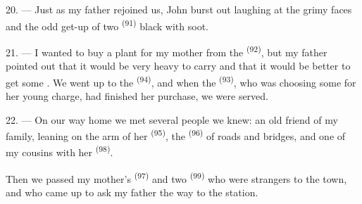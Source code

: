 20. --- Just as my father rejoined us, John burst out laughing at the
grimy faces and the odd get-up of two  \textsuperscript{(91)}
black with soot.

21. --- I wanted to buy a plant for my mother from the 
\textsuperscript{(92)}, but my father pointed out that it would be very heavy to
carry and that it would be better to get some . We went up to
the  \textsuperscript{(94)}, and when the 
\textsuperscript{(93)}, who was choosing some for her young charge, had finished her
purchase, we were served.

22. --- On our way home we met several people we knew: an old friend of my
family, leaning on the arm of her  \textsuperscript{(95)}, the
 \textsuperscript{(96)} of roads and bridges, and one of my cousins
with her  \textsuperscript{(98)}.

Then we passed my mother's  \textsuperscript{(97)} and two
 \textsuperscript{(99)} who were strangers to the town, and who came up to
ask my father the way to the station.
\VUsaut{6.0mm}
\VUfilet{22mm}
